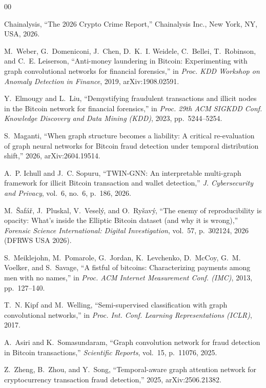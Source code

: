 \begin{thebibliography}{00}
\footnotesize

 Chainalysis, ``The 2026 Crypto Crime Report,'' Chainalysis Inc., New York, NY, USA, 2026.

 M.~Weber, G.~Domeniconi, J.~Chen, D.~K.~I. Weidele, C.~Bellei, T.~Robinson, and C.~E. Leiserson, ``Anti-money laundering in Bitcoin: Experimenting with graph convolutional networks for financial forensics,'' in \emph{Proc. KDD Workshop on Anomaly Detection in Finance}, 2019, arXiv:1908.02591.

 Y.~Elmougy and L.~Liu, ``Demystifying fraudulent transactions and illicit nodes in the Bitcoin network for financial forensics,'' in \emph{Proc. 29th ACM SIGKDD Conf. Knowledge Discovery and Data Mining (KDD)}, 2023, pp.~5244--5254.

 S.~Maganti, ``When graph structure becomes a liability: A critical re-evaluation of graph neural networks for Bitcoin fraud detection under temporal distribution shift,'' 2026, arXiv:2604.19514.

 A.~P. Ichull and J.~C. Sopuru, ``TWIN-GNN: An interpretable multi-graph framework for illicit Bitcoin transaction and wallet detection,'' \emph{J. Cybersecurity and Privacy}, vol.~6, no.~6, p.~186, 2026.

 M.~{\v S}af{\'a}{\v r}, J.~Pluskal, V.~Vesel{\'y}, and O.~Ry{\v s}av{\'y}, ``The enemy of reproducibility is opacity: What's inside the Elliptic Bitcoin dataset (and why it is wrong),'' \emph{Forensic Science International: Digital Investigation}, vol.~57, p.~302124, 2026 (DFRWS USA 2026).

 S.~Meiklejohn, M.~Pomarole, G.~Jordan, K.~Levchenko, D.~McCoy, G.~M. Voelker, and S.~Savage, ``A fistful of bitcoins: Characterizing payments among men with no names,'' in \emph{Proc. ACM Internet Measurement Conf. (IMC)}, 2013, pp.~127--140.

 T.~N. Kipf and M.~Welling, ``Semi-supervised classification with graph convolutional networks,'' in \emph{Proc. Int. Conf. Learning Representations (ICLR)}, 2017.

 A.~Asiri and K.~Somasundaram, ``Graph convolution network for fraud detection in Bitcoin transactions,'' \emph{Scientific Reports}, vol.~15, p.~11076, 2025.

 Z.~Zheng, B.~Zhou, and Y.~Song, ``Temporal-aware graph attention network for cryptocurrency transaction fraud detection,'' 2025, arXiv:2506.21382.


\end{thebibliography}
